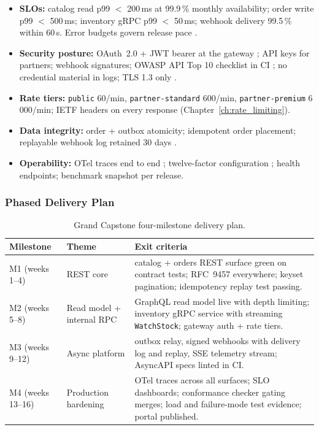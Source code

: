 \begin{itemize}
  \item \textbf{SLOs:} catalog read p99 $<$ 200\,ms at 99.9\,\% monthly
        availability; order write p99 $<$ 500\,ms; inventory gRPC p99 $<$
        50\,ms; webhook delivery 99.5\,\% within 60\,s. Error budgets govern
        release pace \cite{beyer2016sre}.
  \item \textbf{Security posture:} OAuth~2.0 + JWT bearer at the gateway
        \cite{rfc6749,rfc7519}; API keys for partners; webhook signatures;
        OWASP API Top 10 checklist in CI \cite{owaspapisecurity}; no
        credential material in logs; TLS 1.3 only \cite{rfc8446}.
  \item \textbf{Rate tiers:} \texttt{public} 60/min, \texttt{partner-standard}
        600/min, \texttt{partner-premium} 6\,000/min; IETF headers on every
        response \cite{ietf_ratelimit_headers} (Chapter~\ref{ch:rate_limiting}).
  \item \textbf{Data integrity:} order + outbox atomicity; idempotent order
        placement; replayable webhook log retained 30 days
        \cite{kleppmann2017ddia}.
  \item \textbf{Operability:} OTel traces end to end \cite{opentelemetrydocs};
        twelve-factor configuration \cite{twelvefactor}; health endpoints;
        benchmark snapshot per release.
\end{itemize}

\subsubsection{Phased Delivery Plan}

\begin{table}[htbp]
  \centering
  \small
  \begin{tabularx}{\textwidth}{l l X}
    \toprule
    \textbf{Milestone} & \textbf{Theme} & \textbf{Exit criteria} \\
    \midrule
    M1 (weeks 1--4) & REST core &
      catalog + orders REST surface green on contract tests; RFC~9457
      everywhere; keyset pagination; idempotency replay test passing. \\
    M2 (weeks 5--8) & Read model + internal RPC &
      GraphQL read model live with depth limiting; inventory gRPC service
      with streaming \texttt{WatchStock}; gateway auth + rate tiers. \\
    M3 (weeks 9--12) & Async platform &
      outbox relay, signed webhooks with delivery log and replay, SSE
      telemetry stream; AsyncAPI specs linted in CI. \\
    M4 (weeks 13--16) & Production hardening &
      OTel traces across all surfaces; SLO dashboards; conformance checker
      gating merges; load and failure-mode test evidence; portal published. \\
    \bottomrule
  \end{tabularx}
  \caption{Grand Capstone four-milestone delivery plan.}
  \label{tab:milestones}
\end{table}

